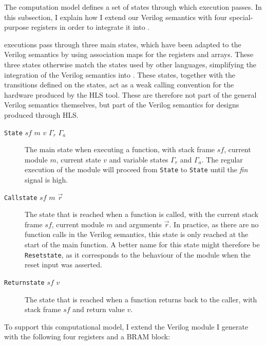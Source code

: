 The \compcert{} computation model defines a set of states through which
execution passes. In this subsection, I explain how I extend our Verilog
semantics with four special-purpose registers in order to integrate it into
\compcert{}.

\compcert{} executions pass through three main states, which have been adapted
to the Verilog semantics by using association maps for the registers and arrays.
These three states otherwise match the states used by other languages,
simplifying the integration of the Verilog semantics into \compcert{}.  These
states, together with the transitions defined on the states, act as a weak
calling convention for the hardware produced by the \gls{HLS} tool.  These are
therefore not part of the general Verilog semantics themselves, but part of the
Verilog semantics for designs produced through \gls{HLS}.
\begin{description}
\item[\texttt{State} $\mathit{sf}$ $m$ $v$ $\Gamma_{r}$ $\Gamma_{a}$] The main
  state when executing a function, with stack frame $\mathit{sf}$, current
  module $m$, current state $v$ and variable states $\Gamma_{r}$ and
  $\Gamma_{a}$.  The regular execution of the module will proceed from
  \texttt{State} to \texttt{State} until the \textit{fin} signal is high.
  \item[\texttt{Callstate} $\mathit{sf}$ $m$ $\vec{r}$] The state that is
    reached when a function is called, with the current stack frame
    $\mathit{sf}$, current module $m$ and arguments $\vec{r}$.  In practice, as
    there are no function calls in the Verilog semantics, this state is only
    reached at the start of the main function.  A better name for this state
    might therefore be \texttt{Resetstate}, as it corresponds to the behaviour
    of the module when the reset input was asserted.
  \item[\texttt{Returnstate} $\mathit{sf}$ $v$] The state that is reached when a
    function returns back to the caller, with stack frame $\mathit{sf}$ and
    return value $v$.
\end{description}

To support this computational model, I extend the Verilog module I generate with
the following four registers and a \gls{BRAM} block:

